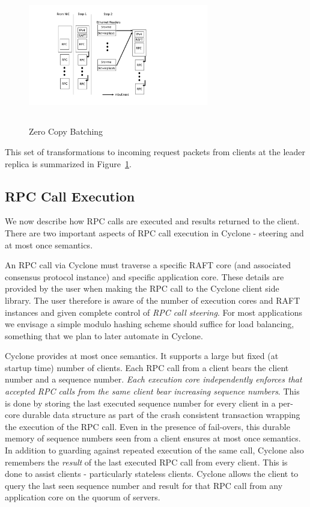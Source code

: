 \documentclass[letterpaper,twocolumn,10pt]{article}
\begin{document}
\begin{figure}
\includegraphics[width=0.7\textwidth,height=6cm]{figures/chain.pdf}
\caption{Zero Copy Batching}
\label{fig:zc_batch}
\end{figure}

This set of transformations to incoming request packets from clients at the
leader replica is summarized in Figure~\ref{fig:zc_batch}. 

\subsection{RPC Call Execution}
\label{sec:exec}
We now describe how RPC calls are executed and results returned to the
client. There are two important aspects of RPC call execution in Cyclone -
steering and at most once semantics.

An RPC call via Cyclone must traverse a specific RAFT core (and associated
consensus protocol instance) and specific application core. These details are
provided by the user when making the RPC call to the Cyclone client side
library. The user therefore is aware of the number of execution cores and RAFT
instances and given complete control of \emph{RPC call steering}. For most
applications we envisage a simple modulo hashing scheme should suffice for load
balancing, something that we plan to later automate in Cyclone.

Cyclone provides at most once semantics. It supports a large but fixed (at
startup time) number of clients. Each RPC call from a client bears the client
number and a sequence number. \emph{Each execution core independently enforces
  that accepted RPC calls from the same client bear increasing sequence
  numbers}. This is done by storing the last executed sequence number for every
client in a per-core durable data structure as part of the crash consistent
transaction wrapping the execution of the RPC call. Even in the presence of
fail-overs, this durable memory of sequence numbers seen from a client ensures
at most once semantics. In addition to guarding against repeated execution of
the same call, Cyclone also remembers the \emph{result} of the last executed RPC
call from every client. This is done to assist clients - particularly stateless
clients. Cyclone allows the client to query the last seen sequence number and
result for that RPC call from any application core on the quorum of servers.
\end{document}

